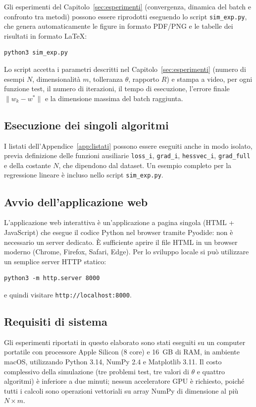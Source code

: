Gli esperimenti del Capitolo~\ref{sec:esperimenti} (convergenza, dinamica del
batch e confronto tra metodi) possono essere riprodotti eseguendo lo script
\texttt{sim\_exp.py}, che genera automaticamente le figure in formato PDF/PNG e
le tabelle dei risultati in formato LaTeX:

\begin{verbatim}
python3 sim_exp.py
\end{verbatim}

Lo script accetta i parametri descritti nel Capitolo~\ref{sec:esperimenti}
(numero di esempi $N$, dimensionalità $m$, tolleranza $\theta$, rapporto
$R$) e stampa a video, per ogni funzione test, il numero di iterazioni, il
tempo di esecuzione, l'errore finale $\|w_k - w^*\|$ e la dimensione massima
del batch raggiunta.

\subsection{Esecuzione dei singoli algoritmi}

I listati dell'Appendice~\ref{app:listati} possono essere eseguiti anche in
modo isolato, previa definizione delle funzioni ausiliarie
\texttt{loss\_i}, \texttt{grad\_i}, \texttt{hessvec\_i}, \texttt{grad\_full}
e della costante $N$, che dipendono dal dataset. Un esempio completo per la
regressione lineare è incluso nello script \texttt{sim\_exp.py}.

\subsection{Avvio dell'applicazione web}

L'applicazione web interattiva è un'applicazione a pagina singola (HTML +
JavaScript) che esegue il codice Python nel browser tramite Pyodide: non è
necessario un server dedicato. È sufficiente aprire il file HTML in un
browser moderno (Chrome, Firefox, Safari, Edge). Per lo sviluppo locale si può
utilizzare un semplice server HTTP statico:

\begin{verbatim}
python3 -m http.server 8000
\end{verbatim}

e quindi visitare \texttt{http://localhost:8000}.

\subsection{Requisiti di sistema}

Gli esperimenti riportati in questo elaborato sono stati eseguiti su un
computer portatile con processore Apple Silicon (8 core) e 16~GB di RAM, in
ambiente macOS, utilizzando Python 3.14, NumPy 2.4 e Matplotlib 3.11. Il costo
complessivo della simulazione (tre problemi test, tre valori di $\theta$ e
quattro algoritmi) è inferiore a due minuti; nessun acceleratore GPU è
richiesto, poiché tutti i calcoli sono operazioni vettoriali su array NumPy di
dimensione al più $N \times m$.
